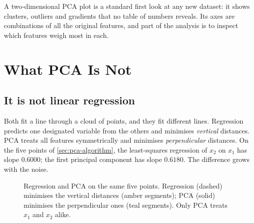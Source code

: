A two-dimensional PCA plot is a standard first look at any new dataset: it shows
clusters, outliers and gradients that no table of numbers reveals. Its axes are
combinations of all the original features, and part of the analysis is to inspect
which features weigh most in each.

\section{What PCA Is Not}
\label{sec:pca-misuse}

\subsection{It is not linear regression}

Both fit a line through a cloud of points, and they fit different lines.
Regression predicts one designated variable from the others and minimises
\emph{vertical} distances. PCA treats all features symmetrically and minimises
\emph{perpendicular} distances. On the five points of \cref{sec:pca-algorithm}, the
least-squares regression of $x_2$ on $x_1$ has slope $0.6000$; the first principal
component has slope $0.6180$. The difference grows with the noise.

\begin{figure}[htbp]
  \centering
  \caption{Regression and PCA on the same five points. Regression (dashed) minimises
  the vertical distances (amber segments); PCA (solid) minimises the perpendicular
  ones (teal segments). Only PCA treats $x_1$ and $x_2$ alike.}
  \label{fig:pca-vs-reg}
\end{figure}

